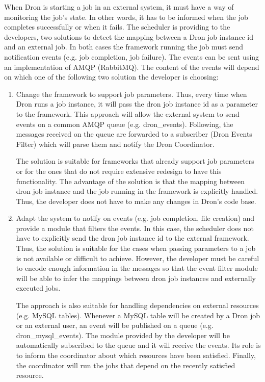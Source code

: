 \documentclass[11pt,a4paper,twoside]{report}
\begin{document}
When Dron is starting a job in an external system, it must have a way of monitoring the job's state. In other words, it has to be informed when the job completes successfully or when it fails. The scheduler is providing to the developers, two solutions to detect the mapping between a Dron job instance id and an external job. In both cases the framework running the job must send notification events (e.g. job completion, job failure). The events can be sent using an implementation of AMQP (RabbitMQ). The content of the events will depend on which one of the following two solution the developer is choosing:


\begin{enumerate}
\item{}
Change the framework to support job parameters. Thus, every time when Dron runs a job instance, it will pass the dron job instance id as a parameter to the framework. This approach will allow the external system to send events on a common AMQP queue (e.g. dron\_events). Following, the messages received on the queue are forwarded to a subscriber (Dron Events Filter) which will parse them and notify the Dron Coordinator.


The solution is suitable for frameworks that already support job parameters or for the ones that do not require extensive redesign to have this functionality. The advantage of the solution is that the mapping between dron job instance and the job running in the framework is explicitly handled. Thus, the developer does not have to make any changes in Dron's code base.

\item{}
Adapt the system to notify on events (e.g. job completion, file creation) and provide a module that filters the events. In this case, the scheduler does not have to explicitly send the dron job instance id to the external framework. Thus, the solution is suitable for the cases when passing parameters to a job is not available or difficult to achieve. However, the developer must be careful to encode enough information in the messages so that the event filter module will be able to infer the mappings between dron job instances and externally executed jobs.


The approach is also suitable for handling dependencies on external resources (e.g. MySQL tables). Whenever a MySQL table will be created by a Dron job or an external user, an event will be published on a queue (e.g. dron\_mysql\_events). The module provided by the developer will be automatically subscribed to the queue and it will receive the events. Its role is to inform the coordinator about which resources have been satisfied. Finally, the coordinator will run the jobs that depend on the recently satisfied resource.
\end{enumerate}
\end{document}
